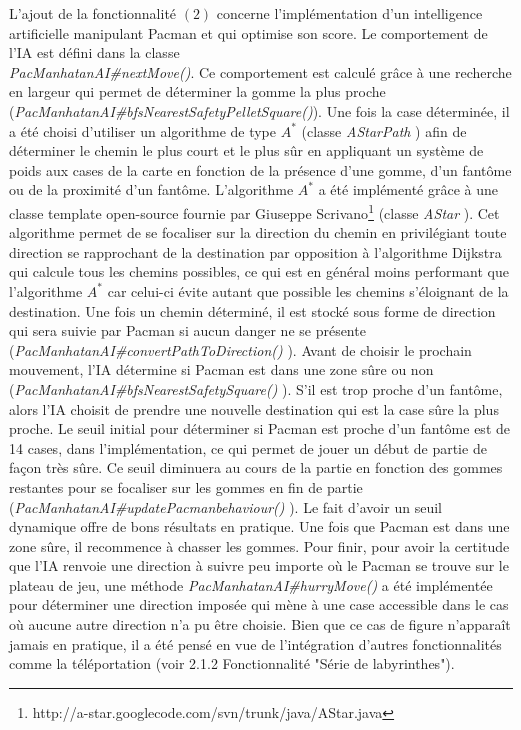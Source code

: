\documentclass[12pt, openany]{report}
\begin{document}
L'ajout de la fonctionnalité $(2)$ concerne l'implémentation d'un intelligence artificielle manipulant Pacman et qui optimise son score. Le comportement de l'IA est défini dans la classe\\
 \mbox{\textit{PacManhatanAI\#nextMove()}}. Ce comportement est calculé grâce à une recherche en largeur qui permet de déterminer la gomme la plus proche (\mbox{\textit{PacManhatanAI\#bfsNearestSafetyPelletSquare()}}). Une fois la case déterminée, il a été choisi d'utiliser un algorithme de type $A^*$ (classe \mbox{\textit{AStarPath}}
) afin de déterminer le chemin le plus court et le plus sûr en appliquant un système de poids aux cases de la carte en fonction de la présence d'une gomme, d'un fantôme ou de la proximité d'un fantôme. L'algorithme $A^*$ a été implémenté grâce à une classe template open-source fournie par Giuseppe Scrivano\footnote{http://a-star.googlecode.com/svn/trunk/java/AStar.java}
(classe \mbox{\textit{AStar}}
). Cet algorithme permet de se focaliser sur la direction du chemin en privilégiant toute direction se rapprochant de la destination par opposition à l'algorithme Dijkstra qui calcule tous les chemins possibles, ce qui est en général moins performant que l'algorithme $A^*$ car celui-ci évite autant que possible les chemins s'éloignant de la destination. Une fois un chemin déterminé, il est stocké sous forme de direction qui sera suivie par Pacman si aucun danger ne se présente (\mbox{\textit{PacManhatanAI\#convertPathToDirection()}}
). Avant de choisir le prochain mouvement, l'IA détermine si Pacman est dans une zone sûre ou non (\mbox{\textit{PacManhatanAI\#bfsNearestSafetySquare()}}
). S'il est trop proche d'un fantôme, alors l'IA choisit de prendre une nouvelle destination qui est la case sûre la plus proche. Le seuil initial pour déterminer si Pacman est proche d'un fantôme est de 14 cases, dans l'implémentation, ce qui permet de jouer un début de partie de façon très sûre. Ce seuil diminuera au cours de la partie en fonction des gommes restantes pour se focaliser sur les gommes en fin de partie (\mbox{\textit{PacManhatanAI\#updatePacmanbehaviour()}}
). Le fait d'avoir un seuil dynamique offre de bons résultats en pratique. Une fois que Pacman est dans une zone sûre, il recommence à chasser les gommes. Pour finir, pour avoir la certitude que l'IA renvoie une direction à suivre peu importe où le Pacman se trouve sur le plateau de jeu, une méthode \mbox{\textit{PacManhatanAI\#hurryMove()}}
a été implémentée pour déterminer une direction imposée qui mène à une case accessible dans le cas où aucune autre direction n'a pu être choisie. Bien que ce cas de figure n'apparaît jamais en pratique, il a été pensé en vue de l'intégration d'autres fonctionnalités comme la téléportation (voir 2.1.2 Fonctionnalité "Série de labyrinthes").
\end{document}
